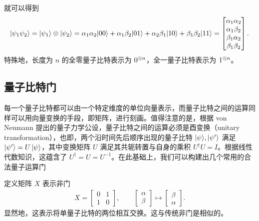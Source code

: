 就可以得到
\begin{align}
    |\psi_1\psi_2\rangle=|\psi_1\rangle\otimes|\psi_2\rangle=\alpha_1\alpha_2|00\rangle+\alpha_1\beta_2|01\rangle+\alpha_2\beta_1|10\rangle+\beta_1\beta_2|11\rangle=
    \begin{bmatrix}
        \alpha_1\alpha_2 \\\alpha_1\beta_2\\\beta_1\alpha_2\\\beta_1\beta_2
    \end{bmatrix}.
\end{align}
特殊地，长度为 $n$ 的全零量子比特表示为 $0^{\otimes n}$，全一量子比特表示为 $1^{\otimes n}$。

\subsection{量子比特门}

每一个量子比特都可以由一个特定维度的单位向量表示，而量子比特之间的运算同样可以用向量变换的手段，即矩阵，进行刻画。值得注意的是，根据 von Neumann 提出的量子力学公设\cite{von2018mathematical}，量子比特之间的运算必须是酉变换（unitary transformation），也即，两个沿时间先后顺序出现的量子比特 $|\psi\rangle,|\psi'\rangle$ 满足 $|\psi'\rangle=U\,|\psi\rangle$，其中变换矩阵 $U$ 满足其共轭转置与自身的乘积 $U^\dagger U=I$。根据线性代数知识，这蕴含了 $U^\dagger=U=U^{-1}$。在此基础上，我们可以构建出几个常用的合法量子运算门

定义矩阵 $X$ 表示非门 \begin{align}
        X=\begin{bmatrix}
              0 & 1 \\
              1 & 0
          \end{bmatrix},\qquad
        \begin{bmatrix}
            \alpha \\\beta
        \end{bmatrix}\mapsto
        \begin{bmatrix}
            \beta \\\alpha
        \end{bmatrix}.
    \end{align}
显然地，这表示将单量子比特的两位相互交换。这与传统非门是相似的。

